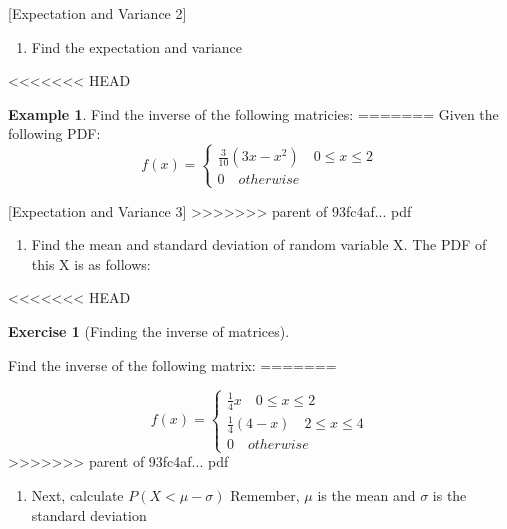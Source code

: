 \documentclass[]{book}
\providecommand{\tightlist}{%
  \setlength{\itemsep}{0pt}\setlength{\parskip}{0pt}}
\theoremstyle{definition}
\theoremstyle{definition}
\newtheorem{example}{Example}[chapter]
\theoremstyle{definition}
\newtheorem{exercise}{Exercise}[chapter]
\theoremstyle{remark}
\begin{document}
[Expectation and Variance 2]
\protect\hypertarget{exr:expvar2}{}{\label{exr:expvar2} {} }

\begin{enumerate}
\def\labelenumi{\arabic{enumi}.}
\tightlist
\item
  Find the expectation and variance
\end{enumerate}

<<<<<<< HEAD
\begin{example}
\protect\hypertarget{exm:inverse}{}{\label{exm:inverse} }
Find the inverse of the following matricies:
=======
Given the following PDF:
\[f(x) =  \begin{cases}
              \frac{3}{10}(3x - x^2) \quad 0 \leq x \leq 2\\
               0 \quad otherwise
            \end{cases}
               \]

[Expectation and Variance 3]
\protect\hypertarget{exr:expvar3}{}{\label{exr:expvar3} {} }
>>>>>>> parent of 93fc4af... pdf

\begin{enumerate}
\def\labelenumi{\arabic{enumi}.}
\tightlist
\item
  Find the mean and standard deviation of random variable X. The PDF of this X is as follows:
\end{enumerate}
<<<<<<< HEAD
\end{example}

\begin{exercise}[Finding the inverse of matrices]
\protect\hypertarget{exr:inverse1}{}{\label{exr:inverse1} {} }

Find the inverse of the following matrix:
=======

\[f(x) =  \begin{cases}
              \frac{1}{4}x \quad 0 \leq x \leq 2\\
               \frac{1}{4}(4 - x)  \quad 2 \leq x \leq 4\\
               0 \quad otherwise
            \end{cases}
               \]
>>>>>>> parent of 93fc4af... pdf

\begin{enumerate}
\def\labelenumi{\arabic{enumi}.}
\setcounter{enumi}{1}
\tightlist
\item
  Next, calculate \(P(X < \mu - \sigma)\) Remember, \(\mu\) is the mean and \(\sigma\) is the standard deviation
\end{enumerate}
\end{exercise}
\end{document}
